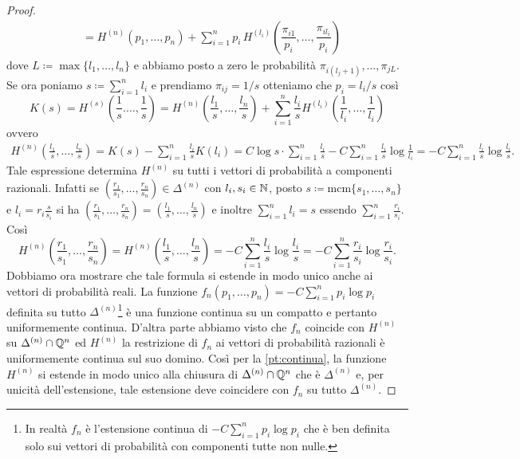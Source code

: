 \begin{proof}
\begin{align*}
        & = H^{(n)}(p_1, \ldots, p_n) + \sum_{i=1}^{n} p_i \, H^{(l_i)} \left(\dfrac{\pi_{i1}}{p_i}, \ldots, \dfrac{\pi_{il_i}}{p_i}\right)
    \end{align*}
    dove $ L \coloneqq \max\{l_1, \ldots, l_n\} $ e abbiamo posto a zero le probabilità $ \pi_{i (l_j+1)}, \ldots, \pi_{jL} $. Se ora poniamo $ s\coloneqq\sum_{i=1}^{n}l_i $ e prendiamo $ \pi_{ij} = 1/s $ otteniamo che $ p_i = l_i/s $ così
    \[ K(s) = H^{(s)}\left(\frac{1}{s}. \ldots, \frac{1}{s}\right) = H^{(n)}\left(\frac{l_1}{s}, \ldots, \frac{l_n}{s}\right) + \sum_{i=1}^{n} \frac{l_i}{s} H^{(l_i)}\left(\frac{1}{l_i}, \ldots, \frac{1}{l_i}\right) \]
    ovvero
    \begin{align*}
        H^{(n)}\left(\frac{l_1}{s}, \ldots, \frac{l_n}{s}\right) = K(s) - \sum_{i=1}^{n} \frac{l_i}{s} K(l_i) = C \log{s} \cdot \sum_{i=1}^{n} \frac{l_i}{s} - C \sum_{i=1}^{n} \frac{l_i}{s} \log{\frac{1}{l_i}} = - C \sum_{i=1}^{n}\frac{l_i}{s} \log{\frac{l_i}{s}}.
    \end{align*}
    Tale espressione determina $ H^{(n)} $ su tutti i vettori di probabilità a componenti razionali. Infatti se $ \left(\frac{r_1}{s_1},\ldots,\frac{r_n}{s_n}\right) \in \Delta^{(n)} $ con $ l_i, s_i \in \mathbb{N} $, posto $ s \coloneqq \mathrm{mcm}\{s_1, \ldots, s_n\} $ e $ l_i = r_i \frac{s}{s_i} $ si ha $ \left(\frac{r_1}{s_1},\ldots,\frac{r_n}{s_n}\right) = \left(\frac{l_1}{s}, \ldots, \frac{l_n}{s}\right) $ e inoltre $ \sum_{i=1}^{n} l_i = s $ essendo $ \sum_{i=1}^{n}\frac{r_i}{s_i} $. Così
    \[ H^{(n)}\left(\frac{r_1}{s_1},\ldots,\frac{r_n}{s_n}\right) = H^{(n)}\left(\frac{l_1}{s}, \ldots, \frac{l_n}{s}\right) = - C \sum_{i=1}^{n}\frac{l_i}{s} \log{\frac{l_i}{s}} = - C \sum_{i=1}^{n}\frac{r_i}{s_i} \log{\frac{r_i}{s_i}}. \]
    Dobbiamo ora mostrare che tale formula si estende in modo unico anche ai vettori di probabilità reali. La funzione $ f_n(p_1, \ldots, p_n) = -C\sum_{i=1}^{n}p_i \log{p_i} $ definita su tutto $ \Delta^{(n)} $\footnote{In realtà $ f_n $ è l'estensione continua di $ -C\sum_{i=1}^{n}p_i \log{p_i} $ che è ben definita solo sui vettori di probabilità con componenti tutte non nulle.} è una funzione continua su un compatto e pertanto uniformemente continua. D'altra parte abbiamo visto che $ f_n $ coincide con $ H^{(n)} $ su $ \Delta^{(n)} \cap \mathbb{Q}^{n} $ ed $ H^{(n)} $ la restrizione di $ f_n $ ai vettori di probabilità razionali è uniformemente continua sul suo domino. Così per la \ref{pt:continua}, la funzione $ H^{(n)} $ si estende in modo unico alla chiusura di $ \Delta^{(n)} \cap \mathbb{Q}^{n} $ che è $ \Delta^{(n)} $ e, per unicità dell'estensione, tale estensione deve coincidere con $ f_n $ su tutto $ \Delta^{(n)} $.
\end{proof}

